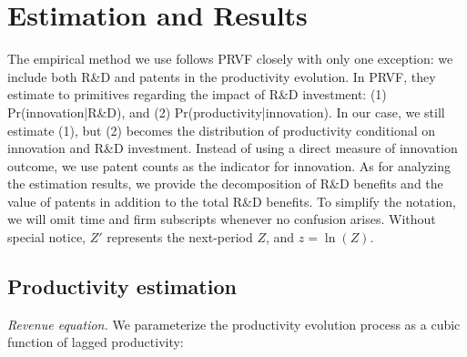 \documentclass[11pt]{article}
\begin{document}
\section{Estimation and Results}
The empirical method we use follows PRVF closely with only one exception: we include both R\&D and patents in the productivity evolution. In PRVF, they estimate to primitives regarding the impact of R\&D investment: (1) Pr(innovation|R\&D), and (2) Pr(productivity|innovation). In our case, we still estimate (1), but (2) becomes the distribution of productivity conditional on innovation and R\&D investment. Instead of using a direct measure of innovation outcome, we use patent counts as the indicator for innovation. As for analyzing the estimation results, we provide the decomposition of R\&D benefits and the value of patents in addition to the total R\&D benefits. To simplify the notation, we will omit time and firm subscripts whenever no confusion arises. Without special notice, $Z'$ represents the next-period $Z$, and $z=\ln (Z)$.

\subsection{Productivity estimation}

\textit{Revenue equation.}
We parameterize the productivity evolution process as a cubic function of lagged productivity:
\end{document}
